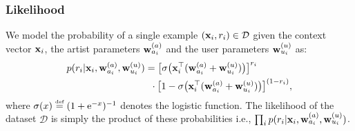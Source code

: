\subsubsection{Likelihood}
We model the probability of a single example $(\mathbf{x}_i, r_i) \in \mathcal{D}$ given the context vector $\mathbf{x}_i$,
the artist parameters $\mathbf{w}^{(a)}_{a_i}$ and the user parameters $\mathbf{w}^{(u)}_{u_i}$  as:
\begin{align}
 p( r_i | \mathbf{x}_i , \mathbf{w}^{(a)}_{a_i}, \mathbf{w}^{(u)}_{u_i} )
& =  \big[ \sigma \big( \mathbf{x}_i^\top ( \mathbf{w}^{(a)}_{a_i} + \mathbf{w}^{(u)}_{u_i} ) \big) \big]^{r_i} \nonumber \\ 
& \ \:  \cdot \big[ 1 - \sigma \big( \mathbf{x}_i^\top ( \mathbf{w}^{(a)}_{a_i} + \mathbf{w}^{(u)}_{u_i} ) \big) \big]^{(1-r_i)} ,
\label{eq:likelihood}
\end{align}
where  $\sigma(x) \defined (1 + \mathrm{e}^{-x})^{-1}$ denotes the logistic function.
The likelihood of the dataset $\mathcal{D}$ is simply the product of these probabilities i.e., $\prod_i p( r_i | \mathbf{x}_i , \mathbf{w}^{(a)}_{a_i}, \mathbf{w}^{(u)}_{u_i})$.



